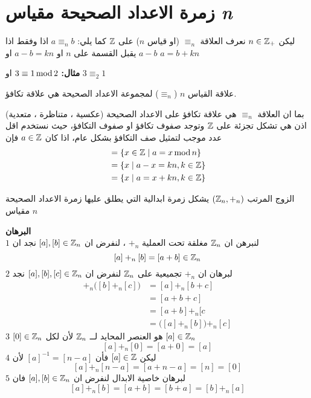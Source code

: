 \section{زمرة الاعداد الصحيحة مقياس \textit{n}}
\begin{definition}
	ليكن $n\in \mathbb{Z}_+$ نعرف العلاقة $\equiv_n$ (او قياس $n$) على $\mathbb{Z}$ كما يلي: $a\equiv_n b$ اذا وفقط اذا $a-b$ يقبل القسمة على $n$ او $a-b = kn$ او $a=b+kn$
\end{definition}
\noindent\textbf{مثال:} $3\equiv1\operatorname{mod} 2$ او $3\equiv_2 1$

\begin{theorem}
	علاقة القياس $n$ ($\equiv_n$) لمجموعة الاعداد الصحيحة هي علاقة تكافؤ.
\end{theorem}

\begin{note}
	بما ان العلاقة $\equiv_n$ هي علاقة تكافؤ على الاعداد الصحيحة (عكسية ، متناظرة ، متعدية) اذن هي تشكل تجزئة على $\mathbb{Z}$ وتوجد صفوف تكافؤ او صفوف التكافؤ، حيث نستخدم اقل عدد موجب لتمثيل صف التكافؤ بشكل عام، اذا كان $a\in \mathbb{Z}$ فإن
	\begin{align*}
			[a] &= \{x\in \Z \mid a=x\Mod n\}\\
			&= \{x\mid a-x = kn, k\in \Z\}\\
			&= \{x\mid a = x + kn, k\in \Z \}
	\end{align*}
\end{note}

\begin{theorem}
	الزوج المرتب  $(\mathbb{Z}_n, +_n)$ يشكل زمرة ابدالية التي يطلق عليها زمرة الاعداد الصحيحة مقياس $n$
\end{theorem}
\noindent
\textbf{البرهان}\\
\noindent
$\boxed{1}$ لنبرهن ان $\mathbb{Z}_n$ مغلقة تحت العملية $+_n$ ، لنفرض ان $[a], [b] \in \mathbb{Z}_n$ نجد ان
\[
[a] +_n [b] = [a + b] \in \mathbb{Z}_n
\]
$\boxed{2}$ لبرهان ان $+_n$ تجميعية على $\mathbb{Z}_n$ لنفرض ان $[a], [b], [c] \in \mathbb{Z}_n$ نجد
\begin{align*}
	[a] +_n \Big([b] +_n [c]\Big)&= [a] +_n [b+c]\\
	&= [a + b+ c] \\
	&= [a + b] +_n [c\\
	&= \Big( [a] +_n [b]\Big) +_n [c]
\end{align*}
$\boxed{3}$ $[0] \in \mathbb{Z}_n$ هو  العنصر المحايد لــ $\mathbb{Z}_n $ لأن لكل $[a] \in \mathbb{Z}_n $
\[
[a] +_n [0] = [a+0] = [a]
\]
$\boxed{4}$ ليكن $[a]\in \mathbb{Z}$ فأن $[a]^{-1} = [n-a] $ لأن 
\[
[a] +_n [n-a] = [a+n-a] = [n] = [0]
\]
$\boxed{5}$ لبرهان خاصية الابدال لنفرض ان $[a], [b] \in \mathbb{Z}_n$ فان 
\[
[a] +_n [b] = [a+b] = [b+a] = [b] +_n [a]
\]


